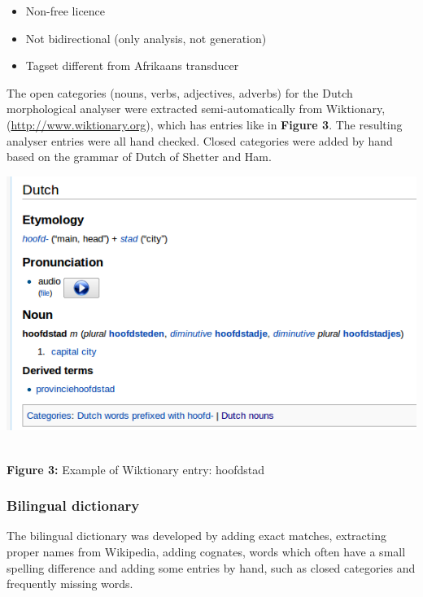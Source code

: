 \documentclass[a0,landscape]{a0poster}
\begin{document}
\begin{multicols}{4}
\begin{itemize}
 \item Non-free licence
 \item Not bidirectional (only analysis, not generation)
 \item Tagset different from Afrikaans transducer
\end{itemize}


\noindent
The open categories (nouns, verbs, adjectives, adverbs) for the Dutch 
morphological analyser were extracted semi-automatically from 
Wiktionary, (\url{http://www.wiktionary.org}), which has entries like in {\bf Figure 3}. The resulting analyser entries were all hand checked.
Closed categories were added by hand based on the grammar of Dutch of Shetter and Ham.
\vspace{0.5cm}

\begin{center}
\begin{minipage}[b]{26cm}
\includegraphics[width=260mm]{hoofdstad.png}
\end{minipage}\\
\textbf{Figure 3:} Example of Wiktionary entry: hoofdstad
\label{wikt1}
\vspace{0.3cm}
\end{center}


\vspace{0.5cm}

\subsubsection{Bilingual dictionary}

\noindent
The bilingual dictionary was developed by adding exact matches, extracting proper names
from Wikipedia, adding cognates, words which often have a small spelling difference and adding
some entries by hand, such as closed categories and frequently missing words.


\end{multicols}
\end{document}

